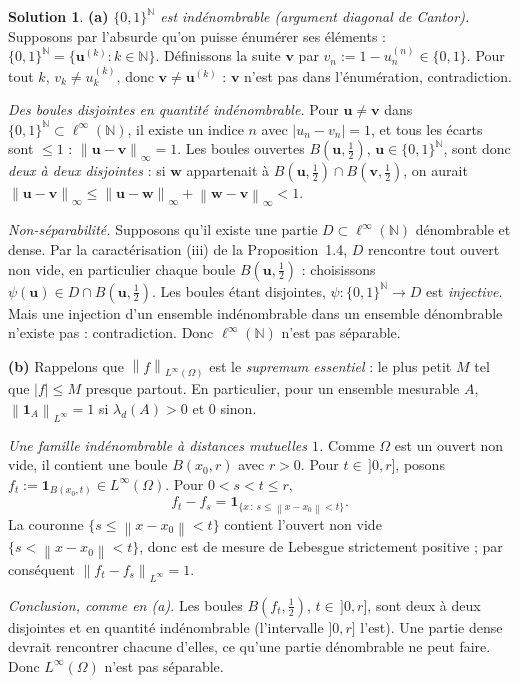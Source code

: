 \documentclass[11pt,a4paper]{article}
\newcommand{\N}{\mathbb{N}}
\newcommand{\norm}[1]{\left\|#1\right\|}
\theoremstyle{definition}
\newtheorem*{solution}{Solution}
\begin{document}
\begin{solution}
\noindent\textbf{(a)} \emph{$\{0,1\}^\N$ est indénombrable (argument diagonal de Cantor).} Supposons par l'absurde qu'on puisse énumérer ses éléments : $\{0,1\}^\N=\{\mathbf u^{(k)}:k\in\N\}$. Définissons la suite $\mathbf v$ par $v_n:=1-u^{(n)}_n\in\{0,1\}$. Pour tout $k$, $v_k\ne u^{(k)}_k$, donc $\mathbf v\ne\mathbf u^{(k)}$ : $\mathbf v$ n'est pas dans l'énumération, contradiction.

\emph{Des boules disjointes en quantité indénombrable.} Pour $\mathbf u\ne\mathbf v$ dans $\{0,1\}^\N\subset\ell^\infty(\N)$, il existe un indice $n$ avec $|u_n-v_n|=1$, et tous les écarts sont $\le1$ : $\norm{\mathbf u-\mathbf v}_\infty=1$. Les boules ouvertes $B(\mathbf u,\frac12)$, $\mathbf u\in\{0,1\}^\N$, sont donc \emph{deux à deux disjointes} : si $\mathbf w$ appartenait à $B(\mathbf u,\frac12)\cap B(\mathbf v,\frac12)$, on aurait $\norm{\mathbf u-\mathbf v}_\infty\le\norm{\mathbf u-\mathbf w}_\infty+\norm{\mathbf w-\mathbf v}_\infty<1$.

\emph{Non-séparabilité.} Supposons qu'il existe une partie $D\subset\ell^\infty(\N)$ dénombrable et dense. Par la caractérisation (iii) de la Proposition~1.4, $D$ rencontre tout ouvert non vide, en particulier chaque boule $B(\mathbf u,\frac12)$ : choisissons $\psi(\mathbf u)\in D\cap B(\mathbf u,\frac12)$. Les boules étant disjointes, $\psi:\{0,1\}^\N\to D$ est \emph{injective}. Mais une injection d'un ensemble indénombrable dans un ensemble dénombrable n'existe pas : contradiction. Donc $\ell^\infty(\N)$ n'est pas séparable.

\medskip
\noindent\textbf{(b)} Rappelons que $\norm f_{L^\infty(\Omega)}$ est le \emph{supremum essentiel} : le plus petit $M$ tel que $|f|\le M$ presque partout. En particulier, pour un ensemble mesurable $A$, $\norm{\mathbf 1_A}_{L^\infty}=1$ si $\lambda_d(A)>0$ et $0$ sinon.

\emph{Une famille indénombrable à distances mutuelles $1$.} Comme $\Omega$ est un ouvert non vide, il contient une boule $B(x_0,r)$ avec $r>0$. Pour $t\in\,]0,r]$, posons $f_t:=\mathbf 1_{B(x_0,t)}\in L^\infty(\Omega)$. Pour $0<s<t\le r$,
\[
f_t-f_s=\mathbf 1_{\{x\,:\,s\le\norm{x-x_0}<t\}} .
\]
La couronne $\{s\le\norm{x-x_0}<t\}$ contient l'ouvert non vide $\{s<\norm{x-x_0}<t\}$, donc est de mesure de Lebesgue strictement positive ; par conséquent $\norm{f_t-f_s}_{L^\infty}=1$.

\emph{Conclusion, comme en (a).} Les boules $B(f_t,\frac12)$, $t\in\,]0,r]$, sont deux à deux disjointes et en quantité indénombrable (l'intervalle $]0,r]$ l'est). Une partie dense devrait rencontrer chacune d'elles, ce qu'une partie dénombrable ne peut faire. Donc $L^\infty(\Omega)$ n'est pas séparable.
\end{solution}
\end{document}
